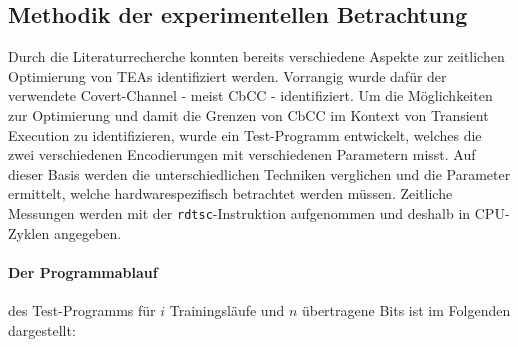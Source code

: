 
\subsection{Methodik der experimentellen Betrachtung}
Durch die Literaturrecherche konnten bereits verschiedene
Aspekte zur zeitlichen Optimierung von \acp{TEA} identifiziert
werden. Vorrangig
wurde dafür der verwendete Covert-Channel - meist \ac{CbCC} -
identifiziert. Um die Möglichkeiten zur Optimierung und
damit die Grenzen von \ac{CbCC} im Kontext von Transient
Execution zu identifizieren, wurde ein Test-Programm entwickelt,
welches die zwei verschiedenen Encodierungen mit verschiedenen
Parametern misst. Auf dieser Basis werden die unterschiedlichen
Techniken verglichen und die Parameter ermittelt, welche
hardwarespezifisch betrachtet werden müssen.
Zeitliche Messungen werden mit der
\verb|rdtsc|-Instruktion aufgenommen und deshalb in
\ac{CPU}-Zyklen angegeben.

\paragraph{Der Programmablauf} des Test-Programms für $i$
Trainingsläufe und $n$ übertragene Bits ist im Folgenden
dargestellt:

